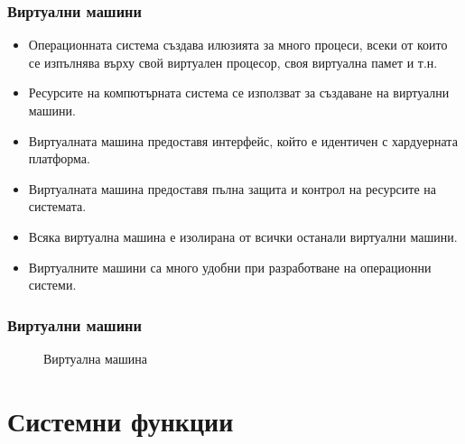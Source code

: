 \documentclass[ignorenonframetext, hyperref=unicode]{beamer}
\begin{document}
\begin{frame}
\frametitle{Виртуални машини}
\begin{itemize}
\item Операционната система създава илюзията за много процеси, всеки от които се
изпълнява върху свой виртуален процесор, своя виртуална памет и т.н.
\item Ресурсите на компютърната система се използват за създаване на виртуални
машини.
\item Виртуалната машина предоставя интерфейс, който е идентичен с хардуерната
платформа. 
\item Виртуалната машина предоставя пълна защита и контрол на ресурсите на
системата.
\item Всяка виртуална машина е изолирана от всички останали виртуални машини.
\item Виртуалните машини са много удобни при разработване на операционни системи.
\end{itemize}
\end{frame}

\begin{frame}
\frametitle{Виртуални машини}
\begin{figure}[h]
\center
{}
\caption{Виртуална машина}
\end{figure}
\end{frame}


\section{Системни функции}
\end{document}

